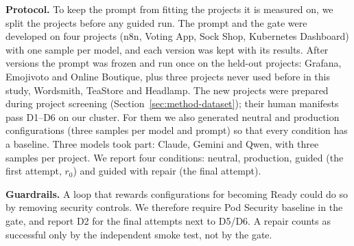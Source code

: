 \textbf{Protocol.} To keep the prompt from fitting the projects it is measured on, we split the projects before any guided run. The prompt and the gate were developed on four projects (n8n, Voting App, Sock Shop, Kubernetes Dashboard) with one sample per model, and each version was kept with its results. After  versions the prompt was frozen and run once on the held-out projects: Grafana, Emojivoto and Online Boutique, plus three projects never used before in this study, Wordsmith, TeaStore and Headlamp. The new projects were prepared during project screening (Section~\ref{sec:method-dataset}); their human manifests pass D1--D6 on our cluster. For them we also generated neutral and production configurations (three samples per model and prompt) so that every condition has a baseline. Three models took part: Claude, Gemini and Qwen, with three samples per project. We report four conditions: neutral, production, guided (the first attempt, $r_0$) and guided with repair (the final attempt).

\textbf{Guardrails.} A loop that rewards configurations for becoming Ready could do so by removing security controls. We therefore require Pod Security baseline in the gate, and report D2 for the final attempts next to D5/D6. A repair counts as successful only by the independent smoke test, not by the gate.
